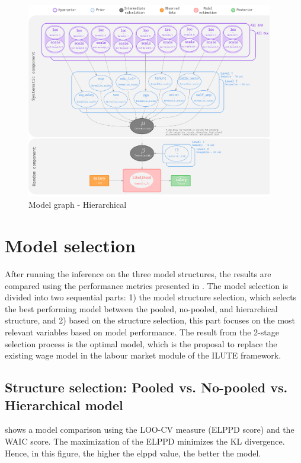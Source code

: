 \begin{figure}[H]
    \centering
    \includegraphics[width=0.96\textwidth]{images/ch5_hierarchical_graph/hierarchical_graph.png}
    \setlength{\abovecaptionskip}{-12pt}
    \caption{Model graph - Hierarchical}
    \label{fig:model_graph_hierarchical}
\end{figure}

\section{Model selection}\label{section:model_selection}

After running the inference on the three model structures, the results are compared using the performance metrics presented in . The model selection is divided into two sequential parts: 1) the model structure selection, which selects the best performing model between the pooled, no-pooled, and hierarchical structure, and 2) based on the structure selection, this part focuses on the most relevant variables based on model performance. The result from the 2-stage selection process is the optimal model, which is the proposal to replace the existing wage model in the labour market module of the ILUTE framework. 

\subsection{Structure selection: Pooled vs. No-pooled vs. Hierarchical model}\label{section:structure_selection} 

 shows a model comparison using the LOO-CV measure (ELPPD score) and the WAIC score. The maximization of the ELPPD minimizes the KL divergence. Hence, in this figure, the higher the elppd value, the better the model.

